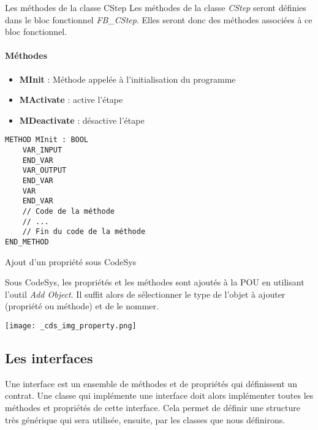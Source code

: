 \begin{UPSTIidee}{Les méthodes de la classe CStep}
    Les méthodes de la classe \emph{CStep} seront définies dans le bloc fonctionnel \emph{FB\_CStep}. Elles seront donc des méthodes associées à ce bloc fonctionnel.

    \begin{minipage}[t]{.5\linewidth}
        \paragraph{Méthodes}
        \begin{itemize}
            \item \textbf{MInit} : Méthode appelée à l'initialisation du programme
            \item \textbf{MActivate} : active l'étape
            \item \textbf{MDeactivate} : désactive l'étape
        \end{itemize}
    \end{minipage}%
    \begin{minipage}[t]{.4\linewidth}
        \begin{lstlisting}
METHOD MInit : BOOL
    VAR_INPUT
    END_VAR
    VAR_OUTPUT
    END_VAR
    VAR
    END_VAR
    // Code de la méthode
    // ...
    // Fin du code de la méthode
END_METHOD
        \end{lstlisting}
    \end{minipage}
\end{UPSTIidee}

\begin{UPSTIinfor}{Ajout d'un propriété sous CodeSys}
    \begin{minipage}{.7\linewidth}
        Sous CodeSys, les propriétés et les méthodes sont ajoutés à la POU en utilisant l'outil \emph{Add Object}. Il suffit alors de sélectionner le type de l'objet à ajouter (propriété ou méthode) et de le nommer.
    \end{minipage}\hfill
    \begin{minipage}{.2\linewidth}
        \centering
        \texttt{[image: \_cds\_img\_property.png]}
    \end{minipage}    
\end{UPSTIinfor}

\subsection{Les interfaces}
Une interface est un ensemble de méthodes et de propriétés qui définissent un contrat. Une classe qui implémente une interface doit alors implémenter toutes les méthodes et propriétés de cette interface. Cela permet de définir une structure très générique qui sera utilisée, ensuite, par les classes que nous définirons. 

